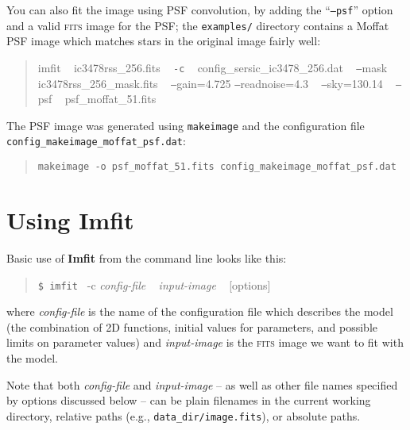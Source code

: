 \documentclass[10pt,a4paper,article]{memoir}
\newcommand{\imfit}{\textbf{Imfit}}
\newcommand{\Imfit}{\textbf{Imfit}}
\newcommand{\imfitprog}{\texttt{imfit}}
\newcommand{\makeimage}{\texttt{makeimage}}
\begin{document}
You can also fit the image using PSF convolution, by adding the ``\texttt{--psf}'' option and a
valid \textsc{fits} image for the PSF; the \texttt{examples/} directory contains a Moffat PSF image which
matches stars in the original image fairly well:
\begin{quote}
imfit ~ ic3478rss\_256.fits ~ \texttt{-c} ~ config\_sersic\_ic3478\_256.dat ~ \texttt{--}mask ~ ic3478rss\_256\_mask.fits ~ \texttt{--}gain=4.725 \texttt{--}readnoise=4.3 ~ \texttt{--}sky=130.14 ~ \texttt{--}psf ~ psf\_moffat\_51.fits
\end{quote}


The PSF image was generated using \makeimage{} and the configuration
file \\
\texttt{config\_makeimage\_moffat\_psf.dat}:
\begin{quote}
\texttt{makeimage -o psf\_moffat\_51.fits config\_makeimage\_moffat\_psf.dat}
\end{quote}




\newpage

\chapter{Using \Imfit{}}\label{sec:using-imfit}\label{chap:using-imfit}

Basic use of \imfit{} from the command line looks like this:
\begin{quote}
  \texttt{\$ \imfitprog{} }  -c \textit{config-file} ~ \textit{input-image} ~ [options]
\end{quote}
where \textit{config-file} is the name of the configuration file
which describes the model (the combination of 2D functions, initial values
for parameters, and possible limits on parameter values) and \textit{input-image}
is the \textsc{fits} image we want to fit with the model. 

Note that both \textit{config-file} and \textit{input-image} -- as well
as other file names specified by options discussed below -- can be plain
filenames in the current working directory, relative paths (e.g.,
\texttt{data\_dir/image.fits}), or absolute paths.
\end{document}
